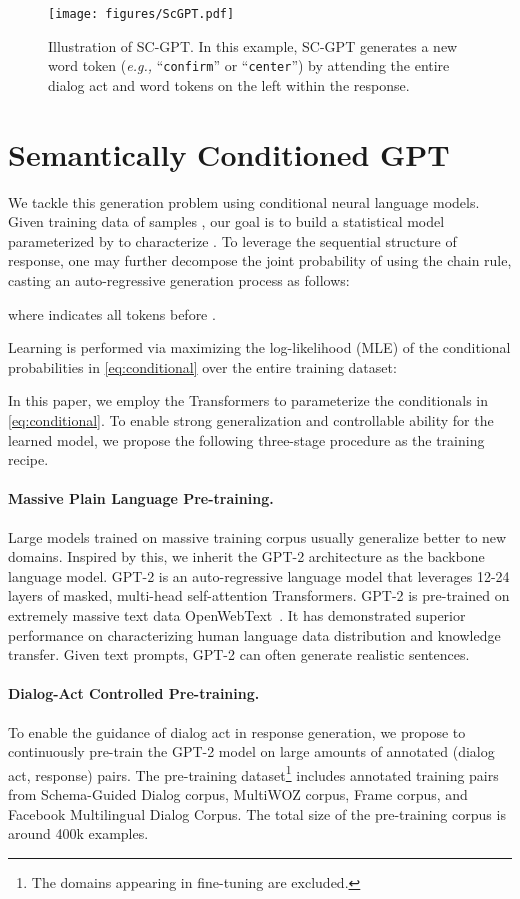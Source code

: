 \documentclass[11pt,a4paper]{article}
\newcommand{\eg}[0]{\emph{e.g., }}
\begin{document}
\begin{figure*}[t!]
\centering
\texttt{[image: figures/ScGPT.pdf]}
\caption{Illustration of SC-GPT. In this example, SC-GPT generates a new word token (\eg ``\texttt{confirm}'' or ``\texttt{center}'') by attending the entire dialog act and word tokens on the left within the response.}
\label{fig:scGPT}
\end{figure*}

\section{Semantically Conditioned GPT}


We tackle this generation problem using conditional neural language models. Given training data of  samples , our goal is to build a statistical model parameterized by  to characterize . To leverage the sequential structure of response, one may further decompose the joint probability of  using the chain rule, casting an auto-regressive generation process as follows:

where  indicates all tokens before .

Learning  is performed via maximizing the log-likelihood (MLE) of the conditional probabilities in \eqref{eq:conditional} over the entire training dataset:



In this paper, we employ the Transformers \citep{transformer} to parameterize the conditionals in \eqref{eq:conditional}. To enable strong generalization and controllable ability for the learned model, we propose the following three-stage procedure as the training recipe. 

\paragraph{Massive Plain Language Pre-training.} Large models trained on massive training corpus usually generalize better to new domains. Inspired by this, we inherit the GPT-2 architecture \citep{gpt2} as the backbone language model. GPT-2 is an auto-regressive language model that leverages 12-24 layers of masked, multi-head self-attention Transformers. GPT-2 is pre-trained on extremely massive text data OpenWebText~\citep{gpt2}. It has demonstrated superior performance on characterizing human language data distribution and knowledge transfer. Given text prompts, GPT-2 can often generate realistic sentences.

\paragraph{Dialog-Act Controlled Pre-training.} To enable the guidance of dialog act in response generation, we propose to continuously pre-train the GPT-2 model on large amounts of annotated (dialog act, response) pairs. 
The pre-training dataset\footnote{The domains appearing in fine-tuning are excluded.} includes annotated training pairs from Schema-Guided Dialog corpus, MultiWOZ corpus, Frame corpus, and Facebook Multilingual Dialog Corpus. The total size of the pre-training corpus is around 400k examples.
\end{document}
